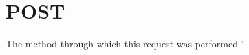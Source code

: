 \hypertarget{POST-example}{
\section{POST}
}
The method through which this request was performed '


\begin{DoxyCodeInclude}
\end{DoxyCodeInclude}
 